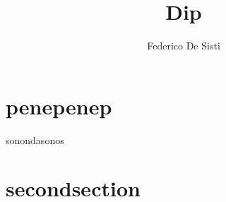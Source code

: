 \documentclass[12px]{article}
\title{Dip}
\author{Federico De Sisti}
\begin{document}
	\maketitle
	\newpage
	\section{penepenep}
	sonondasonos
	\section{secondsection}
	\printindex
	
\end{document}

